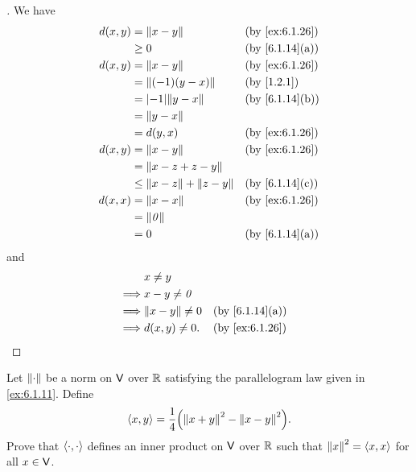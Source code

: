 \begin{proof}[]
  We have
  \begin{align*}
    d(x, y) & = \norm{x - y}                   &  & \by{ex:6.1.26} \\
            & \geq 0                           &  & \by{6.1.14}[a] \\
    d(x, y) & = \norm{x - y}                   &  & \by{ex:6.1.26} \\
            & = \norm{(-1)(y - x)}             &  & \by{1.2.1}     \\
            & = \abs{-1} \norm{y - x}          &  & \by{6.1.14}[b] \\
            & = \norm{y - x}                                       \\
            & = d(y, x)                        &  & \by{ex:6.1.26} \\
    d(x, y) & = \norm{x - y}                   &  & \by{ex:6.1.26} \\
            & = \norm{x - z + z - y}                               \\
            & \leq \norm{x - z} + \norm{z - y} &  & \by{6.1.14}[c] \\
    d(x, x) & = \norm{x - x}                   &  & \by{ex:6.1.26} \\
            & = \norm{\zv}                                         \\
            & = 0                              &  & \by{6.1.14}[a]
  \end{align*}
  and
  \begin{align*}
             & x \neq y                                \\
    \implies & x - y \neq \zv                          \\
    \implies & \norm{x - y} \neq 0 &  & \by{6.1.14}[a] \\
    \implies & d(x, y) \neq 0.     &  & \by{ex:6.1.26}
  \end{align*}
\end{proof}

\begin{ex}\label{ex:6.1.27}
  Let \(\left\lVert\cdot\right\rVert\) be a norm on \(\mathsf{V}\) over \(\mathbb{R}\) satisfying the parallelogram law given in \cref{ex:6.1.11}.
  Define
  \[
    \inn{x, y} = \dfrac{1}{4} \pa{\norm{x + y}^2 - \norm{x - y}^2}.
  \]
  Prove that \(\left\langle\cdot, \cdot\right\rangle\) defines an inner product on \(\mathsf{V}\) over \(\mathbb{R}\) such that \(\left\lVert x\right\rVert^2 = \left\langle x, x\right\rangle\) for all \(x \in \mathsf{V}\).
\end{ex}

